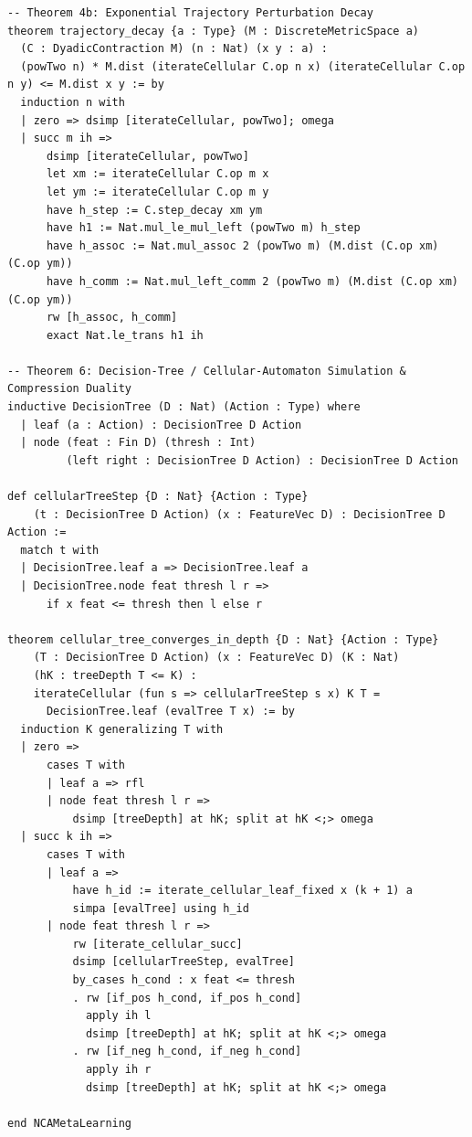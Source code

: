 \documentclass[10pt,twocolumn,letterpaper]{article}
\begin{document}
\begin{lstlisting}
-- Theorem 4b: Exponential Trajectory Perturbation Decay
theorem trajectory_decay {a : Type} (M : DiscreteMetricSpace a) 
  (C : DyadicContraction M) (n : Nat) (x y : a) :
  (powTwo n) * M.dist (iterateCellular C.op n x) (iterateCellular C.op n y) <= M.dist x y := by
  induction n with
  | zero => dsimp [iterateCellular, powTwo]; omega
  | succ m ih =>
      dsimp [iterateCellular, powTwo]
      let xm := iterateCellular C.op m x
      let ym := iterateCellular C.op m y
      have h_step := C.step_decay xm ym
      have h1 := Nat.mul_le_mul_left (powTwo m) h_step
      have h_assoc := Nat.mul_assoc 2 (powTwo m) (M.dist (C.op xm) (C.op ym))
      have h_comm := Nat.mul_left_comm 2 (powTwo m) (M.dist (C.op xm) (C.op ym))
      rw [h_assoc, h_comm]
      exact Nat.le_trans h1 ih

-- Theorem 6: Decision-Tree / Cellular-Automaton Simulation & Compression Duality
inductive DecisionTree (D : Nat) (Action : Type) where
  | leaf (a : Action) : DecisionTree D Action
  | node (feat : Fin D) (thresh : Int)
         (left right : DecisionTree D Action) : DecisionTree D Action

def cellularTreeStep {D : Nat} {Action : Type}
    (t : DecisionTree D Action) (x : FeatureVec D) : DecisionTree D Action :=
  match t with
  | DecisionTree.leaf a => DecisionTree.leaf a
  | DecisionTree.node feat thresh l r =>
      if x feat <= thresh then l else r

theorem cellular_tree_converges_in_depth {D : Nat} {Action : Type}
    (T : DecisionTree D Action) (x : FeatureVec D) (K : Nat)
    (hK : treeDepth T <= K) :
    iterateCellular (fun s => cellularTreeStep s x) K T =
      DecisionTree.leaf (evalTree T x) := by
  induction K generalizing T with
  | zero =>
      cases T with
      | leaf a => rfl
      | node feat thresh l r =>
          dsimp [treeDepth] at hK; split at hK <;> omega
  | succ k ih =>
      cases T with
      | leaf a =>
          have h_id := iterate_cellular_leaf_fixed x (k + 1) a
          simpa [evalTree] using h_id
      | node feat thresh l r =>
          rw [iterate_cellular_succ]
          dsimp [cellularTreeStep, evalTree]
          by_cases h_cond : x feat <= thresh
          . rw [if_pos h_cond, if_pos h_cond]
            apply ih l
            dsimp [treeDepth] at hK; split at hK <;> omega
          . rw [if_neg h_cond, if_neg h_cond]
            apply ih r
            dsimp [treeDepth] at hK; split at hK <;> omega

end NCAMetaLearning
\end{lstlisting}
\end{document}
